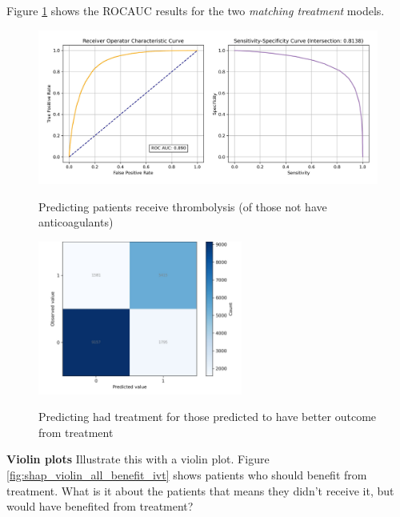 Figure \ref{fig:rocauc_thrombolysis_decision} shows the ROCAUC results for the two \textit{matching treatment} models. 


\begin{figure}
\centering
  \captionsetup{width=.9\linewidth}
  \includegraphics[width=1\textwidth]{./images/200_xgb_8_features_all_data_thrombolysis_decision_roc_sens_spec.jpg}\\
  \caption{Predicting patients receive thrombolysis (of those not have anticoagulants)}
  \label{fig:rocauc_thrombolysis_decision}
\end{figure}


\iffalse
\begin{figure}
\centering
  \includegraphics[width=0.6\textwidth]{./images/200_xgb_8_features_all_data_thrombolysis_decision_confusion_matrix}\\
  \caption{Predicting had treatment for those predicted to have better outcome from treatment}
  \label{fig:cm_thrombolysis_decision}
\end{figure}



\textbf{Violin plots}
Illustrate this with a violin plot. Figure \ref{fig:shap_violin_all_benefit_ivt} shows patients who should benefit from treatment. What is it about the patients that means they didn't receive it, but would have benefited from treatment?


